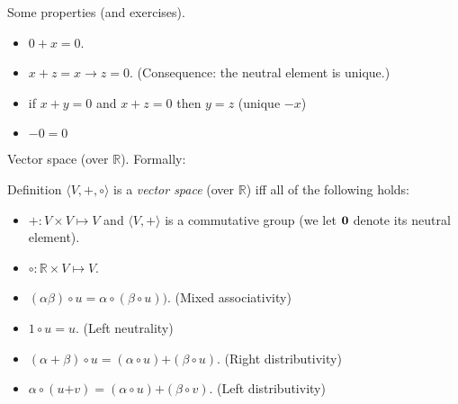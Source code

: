 \documentclass{beamer}
\begin{document}
\begin{frame}{Some properties (and exercises).}
  \begin{itemize}
  \item $0 + x = 0$.
  \item $x + z = x \rightarrow z = 0$. (Consequence: the neutral element is unique.)
  \item if $x + y = 0$ and $x + z = 0$ then $y = z$ (unique $-x$)
  \item $-0 = 0$
  \end{itemize}
\end{frame}


\begin{frame}{Vector space (over $\mathbb{R}$).}
  Formally:
  
  \begin{block}{Definition}
    $\langle V, {\mathbin{\textbf{+}}}, \circ \rangle$ is a \emph{vector space} (over $\mathbb{R}$) iff all of the following holds:
    \begin{itemize}
    \item ${\mathbin{\textbf{+}}}: V \times V \mapsto V$ and $\langle V, {\mathbin{\textbf{+}}} \rangle$ is a commutative group (we let ${\bf 0}$ denote its neutral element).
    \item ${\circ}: \mathbb{R} \times V \mapsto V$.
    \item $(\alpha \beta) \circ u = \alpha \circ (\beta \circ u))$. (Mixed associativity)
    \item $1 \circ u = u$. (Left neutrality)
    \item $(\alpha + \beta) \circ u = (\alpha \circ u) \mathbin{\textbf{+}} (\beta \circ u)$. (Right distributivity)
    \item $\alpha \circ (u\mathbin{\textbf{+}}v) = (\alpha \circ u) \mathbin{\textbf{+}} (\beta \circ v)$. (Left distributivity)
    \end{itemize}
  \end{block}
\end{frame}
\end{document}
